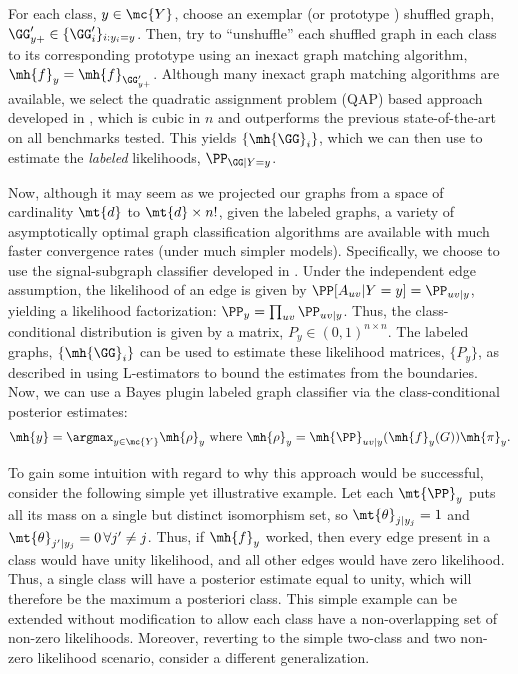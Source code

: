 \documentclass[10pt,journal,cspaper,compsoc]{IEEEtran}
\begin{document}
For each class, $y \in \mc{Y}$, choose an exemplar (or prototype \cite{Bunke2011}) shuffled graph, $\GG'_{y+} \in \{\GG_i'\}_{i: y_i=y}$.  Then, try to ``unshuffle'' each shuffled graph in each class to its corresponding prototype using an inexact graph matching algorithm, $\mh{f}_y=\mh{f}_{\GG'_{y+}}$.  Although many inexact graph matching algorithms are available, we select the quadratic assignment problem (QAP) based approach developed in \cite{VP11QAP}, which is cubic in $n$ and outperforms the previous state-of-the-art on all benchmarks tested.  This yields $\{\mh{\GG}_i\}$, which we can then use to estimate the \emph{labeled} likelihoods, $\PP_{\GG|Y=y}$.   

Now, although it may seem as we projected our graphs from a space of cardinality $\mt{d}$ to $\mt{d} \times n!$, given the labeled graphs, a variety of asymptotically optimal graph classification algorithms are available with much faster convergence rates (under much simpler models).  Specifically, we choose to use the signal-subgraph classifier developed in \cite{VP11sigsub}.  Under the independent edge assumption, the likelihood of an edge is given by $\PP[A_{uv}|Y=y]=\PP_{uv|y}$, yielding a likelihood factorization: $\PP_y=\prod_{uv}\PP_{uv|y}$. Thus, the class-conditional distribution is given by a matrix, $P_y \in (0,1)^{n \times n}$.   The labeled graphs, $\{\mh{\GG}_i\}$ can be used to estimate these likelihood matrices, $\{P_y\}$, as described in \cite{VP11sigsub} using L-estimators to bound the estimates from the boundaries.   Now, we can use a Bayes plugin labeled graph classifier via the class-conditional posterior estimates:
\begin{align}
	\mh{y}=\argmax_{y \in \mc{Y}} \mh{\rho}_y 
	\text{ where } \mh{\rho}_y=\mh{\PP}_{uv|y}(\mh{f}_y(G)) \mh{\pi}_y.
\end{align}


To gain some intuition with regard to why this approach would be successful, consider the following simple yet illustrative example.  Let each $\mt{\PP}_y$ puts all its mass on a single but distinct isomorphism set, so $\mt{\theta}_{j|y_j}=1$ and $\mt{\theta}_{j'|y_j}=0 \, \forall j' \neq j$.  Thus, if $\mh{f}_y$ worked, then every edge present in a class would have unity likelihood, and all other edges would have zero likelihood.  Thus, a single class will have a posterior estimate equal to unity, which will therefore be the maximum a posteriori class.  This simple example can be extended without modification
to allow each class have a non-overlapping set of non-zero likelihoods.  Moreover, reverting to the simple two-class and two non-zero likelihood scenario, consider a different generalization.  %
\end{document}
